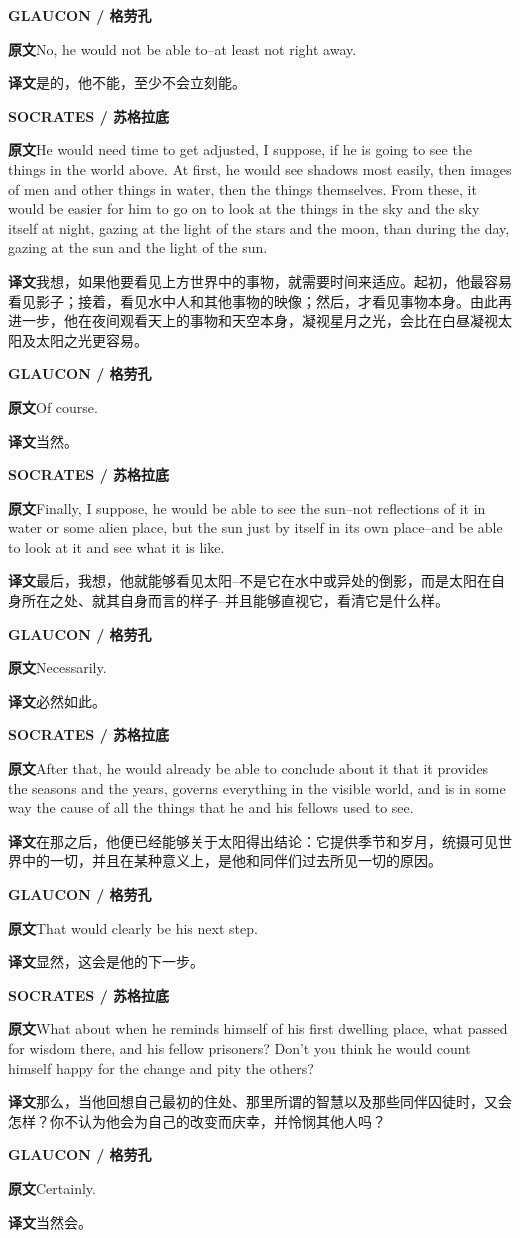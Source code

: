 \documentclass[UTF8,zihao=-4]{ctexart}
\newcommand{\BodyFont}{\fontsize{10.5pt}{15.5pt}\selectfont}
\newcommand{\origlabel}{\textbf{原文}\quad}
\newcommand{\translabel}{\textbf{译文}\quad}
\newenvironment{enblock}{\par\noindent\begingroup\BodyFont\origlabel}{\par\endgroup}
\newenvironment{zhblock}{\par\noindent\begingroup\BodyFont\translabel}{\par\endgroup\vspace{0.35em}}
\newcommand{\en}[1]{\begin{enblock}#1\end{enblock}}
\newcommand{\zh}[1]{\begin{zhblock}#1\end{zhblock}}
\newcommand{\speaker}[2]{\par\medskip\noindent\textbf{#1 / #2}\par}
\begin{document}
\speaker{GLAUCON}{格劳孔}
\en{No, he would not be able to--at least not right away.}
\zh{是的，他不能，至少不会立刻能。}

\speaker{SOCRATES}{苏格拉底}
\en{He would need time to get adjusted, I suppose, if he is going to see the things in the world above. At first, he would see shadows most easily, then images of men and other things in water, then the things themselves. From these, it would be easier for him to go on to look at the things in the sky and the sky itself at night, gazing at the light of the stars and the moon, than during the day, gazing at the sun and the light of the sun.}
\zh{我想，如果他要看见上方世界中的事物，就需要时间来适应。起初，他最容易看见影子；接着，看见水中人和其他事物的映像；然后，才看见事物本身。由此再进一步，他在夜间观看天上的事物和天空本身，凝视星月之光，会比在白昼凝视太阳及太阳之光更容易。}

\speaker{GLAUCON}{格劳孔}
\en{Of course.}
\zh{当然。}

\speaker{SOCRATES}{苏格拉底}
\en{Finally, I suppose, he would be able to see the sun--not reflections of it in water or some alien place, but the sun just by itself in its own place--and be able to look at it and see what it is like.}
\zh{最后，我想，他就能够看见太阳--不是它在水中或异处的倒影，而是太阳在自身所在之处、就其自身而言的样子--并且能够直视它，看清它是什么样。}

\speaker{GLAUCON}{格劳孔}
\en{Necessarily.}
\zh{必然如此。}

\speaker{SOCRATES}{苏格拉底}
\en{After that, he would already be able to conclude about it that it provides the seasons and the years, governs everything in the visible world, and is in some way the cause of all the things that he and his fellows used to see.}
\zh{在那之后，他便已经能够关于太阳得出结论：它提供季节和岁月，统摄可见世界中的一切，并且在某种意义上，是他和同伴们过去所见一切的原因。}

\speaker{GLAUCON}{格劳孔}
\en{That would clearly be his next step.}
\zh{显然，这会是他的下一步。}

\speaker{SOCRATES}{苏格拉底}
\en{What about when he reminds himself of his first dwelling place, what passed for wisdom there, and his fellow prisoners? Don't you think he would count himself happy for the change and pity the others?}
\zh{那么，当他回想自己最初的住处、那里所谓的智慧以及那些同伴囚徒时，又会怎样？你不认为他会为自己的改变而庆幸，并怜悯其他人吗？}

\speaker{GLAUCON}{格劳孔}
\en{Certainly.}
\zh{当然会。}
\end{document}
